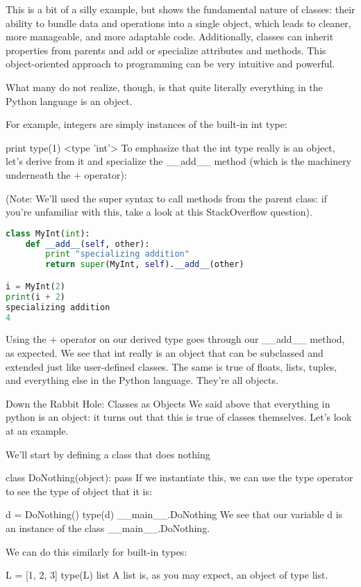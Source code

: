This is a bit of a silly example, but shows the fundamental nature of classes: their ability to bundle data and operations into a single object, which leads to cleaner, more manageable, and more adaptable code. Additionally, classes can inherit properties from parents and add or specialize attributes and methods. This object-oriented approach to programming can be very intuitive and powerful.

What many do not realize, though, is that quite literally everything in the Python language is an object.

For example, integers are simply instances of the built-in int type:

print type(1)
<type 'int'>
To emphasize that the int type really is an object, let's derive from it and specialize the __add__ method (which is the machinery underneath the + operator):

(Note: We'll used the super syntax to call methods from the parent class: if you're unfamiliar with this, take a look at this StackOverflow question).

\begin{lstlisting}[language=Python]
class MyInt(int):
    def __add__(self, other):
        print "specializing addition"
        return super(MyInt, self).__add__(other)

i = MyInt(2)
print(i + 2)
specializing addition
4
\end{lstlisting}

Using the + operator on our derived type goes through our __add__ method, as expected. We see that int really is an object that can be subclassed and extended just like user-defined classes. The same is true of floats, lists, tuples, and everything else in the Python language. They're all objects.

Down the Rabbit Hole: Classes as Objects
We said above that everything in python is an object: it turns out that this is true of classes themselves. Let's look at an example.

We'll start by defining a class that does nothing

class DoNothing(object):
    pass
If we instantiate this, we can use the type operator to see the type of object that it is:

d = DoNothing()
type(d)
__main__.DoNothing
We see that our variable d is an instance of the class __main__.DoNothing.

We can do this similarly for built-in types:

L = [1, 2, 3]
type(L)
list
A list is, as you may expect, an object of type list.

